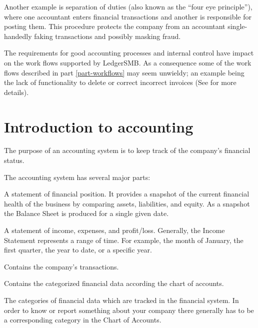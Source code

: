 Another example is separation of duties (also known as the ``four eye principle''),
where one accountant enters financial transactions and another is responsible for
posting them. This procedure protects the company from an accountant single-handedly
faking transactions and possibly masking fraud.

The requirements for good accounting processes and internal control have impact
on the work flows supported by LedgerSMB. As a consequence some of the work flows
described in part \ref{part-workflows} may seem unwieldy; an example being the
lack of functionality to delete or correct incorrect invoices (See  for more details).



\chapter{Introduction to accounting}
\label{cha-accounting-introduction}

The purpose of an accounting system is to keep track of the company's financial status.

The accounting system has several major parts:
\begin{description}[style=nextline]
	\item [Balance Sheet] A statement of financial position. It provides a snapshot of
	the current financial health of the business by comparing assets, liabilities,
	and equity.  As a snapshot the Balance Sheet is produced for a single given date.
	\item [Income Statement] A statement of income, expenses, and profit/loss.
	Generally, the Income Statement represents a range of time. For example,
	the month of January, the first quarter, the year to date, or a specific year.
	\item [General Journal] Contains the company's transactions.
	\item [General Ledger] Contains the categorized financial data according the chart
	of accounts.
	\item [Chart of Accounts] The categories of financial data which are tracked in
	the financial system. In order to know or report something about your company there
	generally has to be a corresponding category in the Chart of Accounts.
\end{description}

